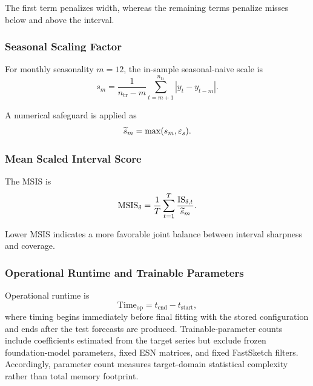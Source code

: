 \documentclass[review,number,sort&compress]{elsarticle}
\begin{document}
The first term penalizes width, whereas the remaining terms penalize misses
below and above the interval.

\subsubsection{Seasonal Scaling Factor}

For monthly seasonality $m=12$, the in-sample seasonal-naive scale is
\begin{equation}
    s_m
    =
    \frac{1}{
    n_{\mathrm{tr}}-m
    }
    \sum_{t=m+1}^{n_{\mathrm{tr}}}
    \left|
    y_t-y_{t-m}
    \right|.
    \label{eq:seasonal_scale}
\end{equation}

A numerical safeguard is applied as
\begin{equation}
    \widetilde{s}_m
    =
    \max(s_m,\varepsilon_s).
\end{equation}

\subsubsection{Mean Scaled Interval Score}

The MSIS is
\begin{equation}
    \mathrm{MSIS}_{\delta}
    =
    \frac{1}{T}
    \sum_{t=1}^{T}
    \frac{
    \mathrm{IS}_{\delta,t}
    }{
    \widetilde{s}_m
    }.
    \label{eq:msis}
\end{equation}

Lower MSIS indicates a more favorable joint balance between interval sharpness
and coverage.

\subsubsection{Operational Runtime and Trainable Parameters}

Operational runtime is
\begin{equation}
    \mathrm{Time}_{\mathrm{op}}
    =
    t_{\mathrm{end}}
    -
    t_{\mathrm{start}},
    \label{eq:operational_time}
\end{equation}
where timing begins immediately before final fitting with the stored
configuration and ends after the test forecasts are produced.
Trainable-parameter counts include coefficients estimated from the target
series but exclude frozen foundation-model parameters, fixed ESN matrices, and fixed FastSketch filters.
Accordingly, parameter count measures target-domain statistical complexity
rather than total memory footprint.
\end{document}

